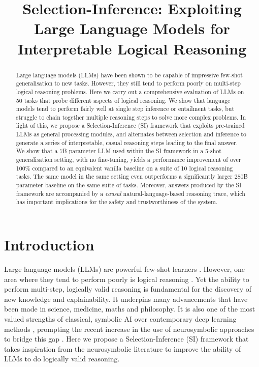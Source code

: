\title{Selection-Inference: Exploiting Large Language Models for Interpretable Logical Reasoning}

\begin{abstract}
Large language models (LLMs) have been shown to be capable of impressive few-shot generalisation to new tasks. However, they still tend to perform poorly on multi-step logical reasoning problems. Here we carry out a comprehensive evaluation of LLMs on 50  tasks that probe different aspects of logical reasoning. We show that language models tend to perform fairly well at single step inference or entailment tasks, but struggle to chain together multiple reasoning steps to solve more complex problems. In light of this, we propose a Selection-Inference (SI) framework that exploits pre-trained LLMs as general processing modules, and alternates between selection and inference to generate a series of interpretable, casual reasoning steps leading to the final answer. We show that a 7B parameter LLM used within the SI framework in a 5-shot generalisation setting, with no fine-tuning, yields a performance improvement of over 100\% compared to an equivalent vanilla baseline on a suite of 10  logical reasoning tasks. The same model in the same setting even outperforms a significantly larger 280B parameter baseline on the same suite of tasks. Moreover, answers produced by the SI framework are accompanied by a \emph{causal} natural-language-based reasoning trace, which has important implications for the safety and trustworthiness of the system.
\end{abstract}

\section{Introduction}
Large language models (LLMs) are powerful few-shot learners \citep{bommasani2021opportunities, brown2020language, lu2021pretrained}. However, one area where they tend to perform poorly is logical reasoning \citep{rae2021scaling}. Yet the ability to perform multi-step, logically valid reasoning is fundamental for the discovery of new knowledge and explainability. It underpins many advancements that have been made in science, medicine, maths and philosophy. It is also one of the most valued strengths of classical, symbolic AI over contemporary deep learning methods \citep{marcus2019rebooting, marcus2020next,bengio2021deep}, prompting the recent increase in the use of neurosymbolic approaches to bridge this gap \citep{garnelo2019reconciling,garcez2020neurosymbolic}. Here we propose a Selection-Inference (SI) framework that takes inspiration from the neurosymbolic literature to improve the ability of LLMs to do logically valid reasoning.

